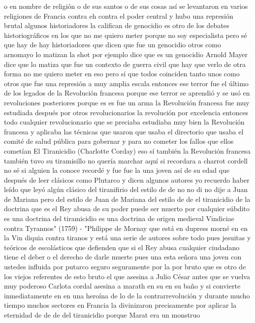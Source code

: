 o en nombre de religión o de sus santos o de sus cosas así se levantaron en varios religiones de Francia
contra eh contra el poder central y hubo una represión brutal algunos historiadores la califican de genocidio
es otro de los debates historiográficos en los que no me quiero meter porque no soy especialista pero sé que hay de hay historiadores que dicen que fue un genocidio
otros como arnomayo lo matizan la shot por ejemplo dice que es un genocidio Arnold Mayer dice que lo matiza
que fue un contexto de guerra civil que hay que verlo de otra forma no me quiero meter en eso pero sí que todos coinciden tanto unos como otros
que fue una represión a muy amplia escala entonces ese terror
fue el último de los legados de la Revolución francesa porque ese terror se aprendió y se usó en revoluciones posteriores
porque es es fue un arma la Revolución francesa fue muy estudiada después por otros revolucionarios la revolución por excelencia
entonces todo cualquier revolucionario que se preciaba estudiaba muy bien la Revolución francesa y aplicaba las técnicas que usaron que usaba el directorio
que usaba el comité de salud pública para gobernar y para no cometer los fallos que ellos cometían
El Tiranicidio (Charlotte Corday)
eso sí también la Revolución francesa también tuvo su tiramisillo no quería marchar aquí si recordara a charrot cordell no sé si alguien la conoce
recordé y fue fue la una joven así de su edad que después de leer clásicos como Plutarco
y dicen algunos autores yo recuerdo haber leído que leyó algún clásico del tiranifirio del estilo de de no no di no dije a Juan de Mariana
pero del estilo de Juan de Mariana del estilo de de el tiranicidio de la doctrina que es el Rey
abusa de su poder puede ser muerto por cualquier súbdito es una doctrina del tiramicidio es una doctrina de origen medieval
Vindiciae contra Tyrannos" (1759) - "Philippe de Mornay
que está en dupress morné en en la Vin diquia contra tiranos y está una serie de autores sobre todo pues jesuitas y teóricos de escolásticos
que defienden que si el Rey abusa cualquier ciudadano tiene el deber o el derecho de darle muerte
pues una esta señora una joven con ustedes influida por putarco seguro seguramente por la por bruto
que es otro de los viejos referentes de esto bruto el que asesina a Julio César antes que se vuelva muy poderoso
Carlota cordal asesina a marath en su en su baño
y si convierte inmediatamente en en una heroína de lo de la contrarrevolución y durante mucho tiempo muchos sectores en Francia la divinizaron
precisamente por aplicar la eternidad de de de del tiranicidio porque Marat era un monstruo
